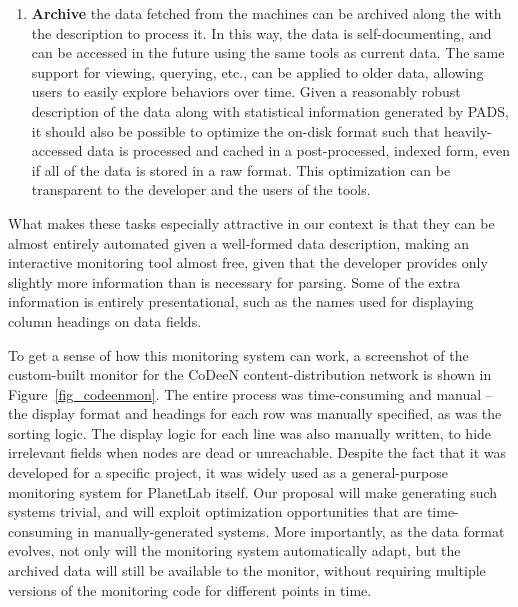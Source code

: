 \begin{enumerate}
\item {\bf Archive} the data fetched from the machines can be archived
along the with the description to process it. In this way, the data is
self-documenting, and can be accessed in the future using the same
tools as current data. The same support for viewing, querying, etc.,
can be applied to older data, allowing users to easily explore
behaviors over time. Given a reasonably robust description of the data
along with statistical information generated by PADS, it should also
be possible to optimize the on-disk format such that heavily-accessed
data is processed and cached in a post-processed, indexed form, even
if all of the data is stored in a raw format. This optimization can be
transparent to the developer and the users of the tools.

\end{enumerate}

What makes these tasks especially attractive in our context is that
they can be almost entirely automated given a well-formed data
description, making an interactive monitoring tool almost free, given
that the developer provides only slightly more information than is
necessary for parsing. Some of the extra information is entirely
presentational, such as the names used for displaying column headings
on data fields.

To get a sense of how this monitoring system can work, a screenshot of
the custom-built monitor for the CoDeeN content-distribution network
is shown in Figure~\ref{fig_codeenmon}. The entire process was
time-consuming and manual -- the display format and headings for each
row was manually specified, as was the sorting logic. The display
logic for each line was also manually written, to hide irrelevant
fields when nodes are dead or unreachable. Despite the fact that it
was developed for a specific project, it was widely used as a
general-purpose monitoring system for PlanetLab itself. Our proposal
will make generating such systems trivial, and will exploit
optimization opportunities that are time-consuming in
manually-generated systems. More importantly, as the data format
evolves, not only will the monitoring system automatically adapt, but
the archived data will still be available to the monitor, without
requiring multiple versions of the monitoring code for different points
in time.

